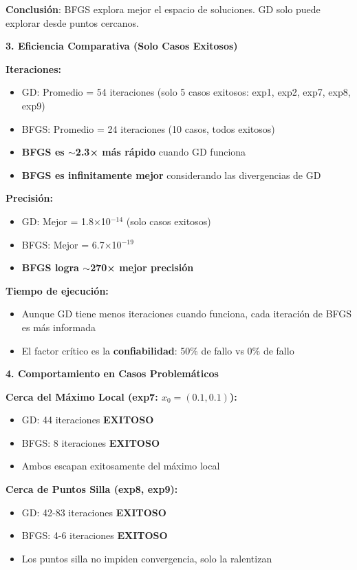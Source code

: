 \documentclass[12pt,a4paper]{article}
\begin{document}
\textbf{Conclusión}: BFGS explora mejor el espacio de soluciones. GD solo puede explorar desde puntos cercanos.

\textbf{3. Eficiencia Comparativa (Solo Casos Exitosos)}

\textbf{Iteraciones:}
\begin{itemize}
    \item GD: Promedio = 54 iteraciones (solo 5 casos exitosos: exp1, exp2, exp7, exp8, exp9)
    \item BFGS: Promedio = 24 iteraciones (10 casos, todos exitosos)
    \item \textbf{BFGS es $\sim$2.3× más rápido} cuando GD funciona
    \item \textbf{BFGS es infinitamente mejor} considerando las divergencias de GD
\end{itemize}

\textbf{Precisión:}
\begin{itemize}
    \item GD: Mejor = 1.8×10$^{-14}$ (solo casos exitosos)
    \item BFGS: Mejor = 6.7×10$^{-19}$
    \item \textbf{BFGS logra $\sim$270× mejor precisión}
\end{itemize}

\textbf{Tiempo de ejecución:}
\begin{itemize}
    \item Aunque GD tiene menos iteraciones cuando funciona, cada iteración de BFGS es más informada
    \item El factor crítico es la \textbf{confiabilidad}: 50\% de fallo vs 0\% de fallo
\end{itemize}

\textbf{4. Comportamiento en Casos Problemáticos}

\textbf{Cerca del Máximo Local (exp7: $x_0 = (0.1, 0.1)$):}
\begin{itemize}
    \item GD: 44 iteraciones \textbf{EXITOSO}
    \item BFGS: 8 iteraciones \textbf{EXITOSO}
    \item Ambos escapan exitosamente del máximo local
\end{itemize}

\textbf{Cerca de Puntos Silla (exp8, exp9):}
\begin{itemize}
    \item GD: 42-83 iteraciones \textbf{EXITOSO}
    \item BFGS: 4-6 iteraciones \textbf{EXITOSO}
    \item Los puntos silla no impiden convergencia, solo la ralentizan
\end{itemize}
\end{document}

